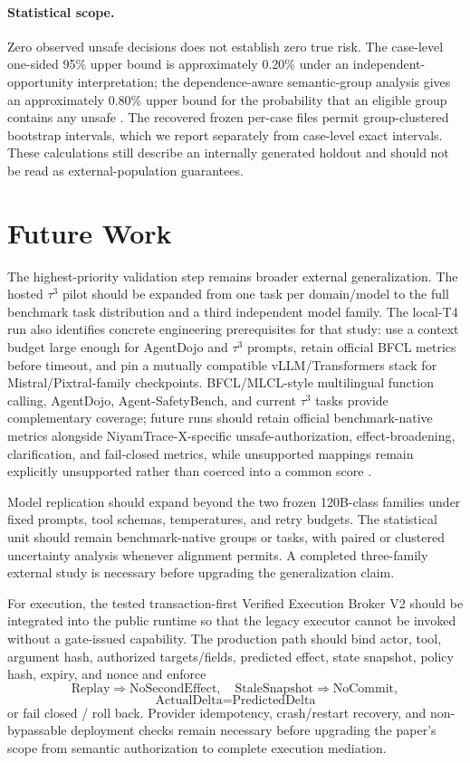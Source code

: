 \paragraph{Statistical scope.}
Zero observed unsafe \allow decisions does not establish zero true risk. The case-level one-sided 95\% upper bound is approximately 0.20\% under an independent-opportunity interpretation; the dependence-aware semantic-group analysis gives an approximately 0.80\% upper bound for the probability that an eligible group contains any unsafe \allow. The recovered frozen per-case files permit group-clustered bootstrap intervals, which we report separately from case-level exact intervals. These calculations still describe an internally generated holdout and should not be read as external-population guarantees.

\section{Future Work}
The highest-priority validation step remains broader external generalization. The hosted $\tau^3$ pilot should be expanded from one task per domain/model to the full benchmark task distribution and a third independent model family. The local-T4 run also identifies concrete engineering prerequisites for that study: use a context budget large enough for AgentDojo and $\tau^3$ prompts, retain official BFCL metrics before timeout, and pin a mutually compatible vLLM/Transformers stack for Mistral/Pixtral-family checkpoints. BFCL/MLCL-style multilingual function calling, AgentDojo, Agent-SafetyBench, and current $\tau^3$ tasks provide complementary coverage; future runs should retain official benchmark-native metrics alongside NiyamTrace-X-specific unsafe-authorization, effect-broadening, clarification, and fail-closed metrics, while unsupported mappings remain explicitly unsupported rather than coerced into a common score \cite{bfcl2025,lostexecution2026,agentdojo2024,agentsafetybench2024,tau2bench2025}.

Model replication should expand beyond the two frozen 120B-class families under fixed prompts, tool schemas, temperatures, and retry budgets. The statistical unit should remain benchmark-native groups or tasks, with paired or clustered uncertainty analysis whenever alignment permits. A completed three-family external study is necessary before upgrading the generalization claim.

For execution, the tested transaction-first Verified Execution Broker V2 should be integrated into the public runtime so that the legacy executor cannot be invoked without a gate-issued capability. The production path should bind actor, tool, argument hash, authorized targets/fields, predicted effect, state snapshot, policy hash, expiry, and nonce and enforce
\[
\text{Replay}\Rightarrow\text{NoSecondEffect},\quad
\text{StaleSnapshot}\Rightarrow\text{NoCommit},
\]
\[
\text{ActualDelta}=\text{PredictedDelta}
\]
or fail closed / roll back. Provider idempotency, crash/restart recovery, and non-bypassable deployment checks remain necessary before upgrading the paper's scope from semantic authorization to complete execution mediation.

